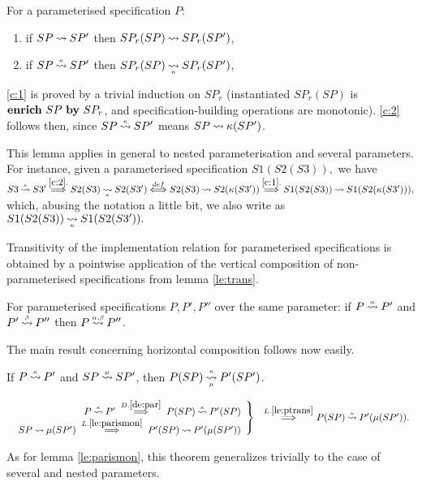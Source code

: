 \begin{LEMMA}\label{le:parismon}
For a parameterised specification $P$:
\begin{enumerate}\MyLPar
\item\label{c:1} if $SP\mathbin{\leadsto} SP'$ then $SP_r(SP)\mathbin{\leadsto} SP_r(SP')$, \item\label{c:2} if $SP\mathbin{\stackrel{\scriptscriptstyle \kappa}{\mathbin{\leadsto}}} SP'$ then $SP_r(SP)\imp{}{\kappa} SP_r(SP')$,
\end{enumerate}
\end{LEMMA}
\begin{PROOF}
\ref{c:1} is proved by a trivial induction on $SP_r$ (instantiated $SP_r(SP)$ is ${\bf enrich\ }SP\ {\bf by}\ SP_r$, and specification-building operations are monotonic). \ref{c:2} follows then, since $SP\mathbin{\stackrel{\scriptscriptstyle \kappa}{\mathbin{\leadsto}}}SP'$ means $SP\mathbin{\leadsto} \kappa(SP')$. \end{PROOF}
\noindent This lemma applies in general to nested parameterisation and several parameters. For instance, given a parameterised specification $S1(S2(S3)),$ we have
$S3\imm\kappa S3'\TTo{\ref{c:2}.} S2(S3)\imp{}{\kappa} S2(S3') \ToT{def} S2(S3)\im S2(\kappa(S3')) \TTo{\ref{c:1}.} S1(S2(S3))\im S1(S2(\kappa(S3'))),$ which, abusing 
the notation a little bit, we also write as $S1(S2(S3))\imp{}{\kappa} S1(S2(S3')).$ %

Transitivity of the implementation relation for parameterised specifications is obtained by a pointwise application of the vertical composition of non-parameterised specifications from lemma \ref{le:trans}. 

\begin{LEMMA}\label{le:ptrans}
For parameterised specifications $P,P',P''$ over the same parameter: if $P\mathbin{\stackrel{\scriptscriptstyle \alpha}{\mathbin{\leadsto}}} P'$ and $P'\mathbin{\stackrel{\scriptscriptstyle \beta}{\mathbin{\leadsto}}} P''$ then $P\mathbin{\stackrel{\scriptscriptstyle \alpha;\beta}{\mathbin{\leadsto}}} P''$. \end{LEMMA}
The main result concerning horizontal composition follows now easily. %

\begin{THEOREM}\label{th:horizontal}
If $P\mathbin{\stackrel{\scriptscriptstyle \kappa}{\mathbin{\leadsto}}} P'$ and $SP\mathbin{\stackrel{\scriptscriptstyle \mu}{\mathbin{\leadsto}}} SP'$, then $P(SP)\imp{\kappa}{\mu} P'(SP')$.
\end{THEOREM}
\begin{PROOF}
\( \begin{array}[t]{rl}
\left . \begin{array}{r}
P\imm{\kappa} P'\ \ovr\Longrightarrow{D.\ref{de:par}}\ 
P(SP)\imm{\kappa}P'(SP) \\
SP\im\mu(SP')\ \ovr\Longrightarrow{L.\ref{le:parismon}}\ P'(SP)\im P'(\mu(SP'))
\end{array} \right \} &
\ovr\Longrightarrow{L.\ref{le:ptrans}}\ P(SP)\imm{\kappa}P'(\mu(SP')). \end{array} \)
\end{PROOF}
\noindent As for lemma \ref{le:parismon}, this theorem generalizes trivially to the case of several and nested parameters. 

